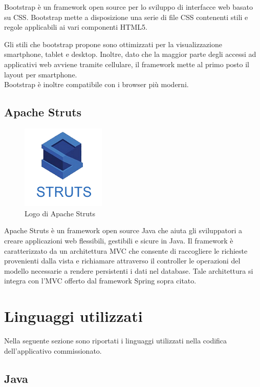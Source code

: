 \noindent Bootstrap è un framework open source per lo sviluppo di interfacce web basato su CSS. Bootstrap mette a disposizione una serie di file CSS contenenti stili e regole applicabili ai vari componenti HTML5.

\setlength{\parskip}{3ex}

\noindent Gli stili che bootstrap propone sono ottimizzati per la visualizzazione smartphone, tablet e desktop. Inoltre, dato che la maggior parte degli accessi ad applicativi web avviene tramite cellulare, il framework mette al primo posto il layout per smartphone.\\
Bootstrap è inoltre compatibile con i browser più moderni.

\subsection{Apache Struts}

\begin{figure}[!h]
	\centering
	\includegraphics[width=4cm]{../images/Struts-logo.png}
	\caption{Logo di Apache Struts}
\end{figure}

\noindent Apache Struts è un framework open source Java che aiuta gli sviluppatori a creare applicazioni web flessibili, gestibili e sicure in Java. Il framework è caratterizzato da un architettura MVC che consente di raccogliere le richieste provenienti dalla vista e richiamare attraverso il controller le operazioni del modello necessarie a rendere persistenti i dati nel database. Tale architettura si integra con l'MVC offerto dal framework Spring sopra citato.

\pagebreak

\section{Linguaggi utilizzati}
Nella seguente sezione sono riportati i linguaggi utilizzati nella codifica dell'applicativo commissionato.

\subsection{Java}


